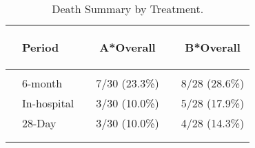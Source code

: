 \documentclass[dvips,10pt]{article}
\begin{document}
\begin{table}[t]
\caption
{ Death Summary by Treatment. }
\begin{center}
\begin{tabular}{ @{}l@{}
@{}l@{}@{}p{1.5em}@{}@{}c@{}@{}p{1.5em}@{}@{}c@{}
}
\hline

& \parbox{6em}{\begin{center}Period\end{center}} && \parbox{6em}{\begin{center}A*Overall\end{center}} && \parbox{6em}{\begin{center}B*Overall\end{center}} \\

\hline

\\
& 6-month && 7/30 (23.3\%) && 8/28 (28.6\%) \\
& In-hospital && 3/30 (10.0\%) && 5/28 (17.9\%) \\
& 28-Day && 3/30 (10.0\%) && 4/28 (14.3\%) \\
\\
\hline \\

\end{tabular}

\end{center}
 \end{table}
\clearpage

\begin{figure}
\end{figure}
\clearpage
\end{document}
